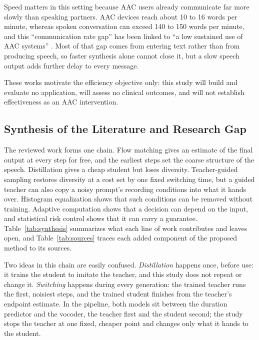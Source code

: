 Speed matters in this setting because AAC users already communicate far more slowly than speaking partners. AAC devices reach about 10 to 16 words per minute, whereas spoken conversation can exceed 140 to 150 words per minute, and this \enquote{communication rate gap} has been linked to \enquote{a low sustained use of AAC systems} \parencite[pp.~1--2]{yusufali2023rate}. Most of that gap comes from entering text rather than from producing speech, so faster synthesis alone cannot close it, but a slow speech output adds further delay to every message.

These works motivate the efficiency objective only: this study will build and evaluate no application, will assess no clinical outcomes, and will not establish effectiveness as an AAC intervention.

\subsection{Synthesis of the Literature and Research Gap}
\label{sec:rrl-synthesis}
\label{sec:rrl-gap}

The reviewed work forms one chain. Flow matching gives an estimate of the final output at every step for free, and the earliest steps set the coarse structure of the speech. Distillation gives a cheap student but loses diversity. Teacher-guided sampling restores diversity at a cost set by one fixed switching time, but a guided teacher can also copy a noisy prompt's recording conditions into what it hands over. Histogram equalization shows that such conditions can be removed without training. Adaptive computation shows that a decision can depend on the input, and statistical risk control shows that it can carry a guarantee. Table~\ref{tab:synthesis} summarizes what each line of work contributes and leaves open, and Table~\ref{tab:sources} traces each added component of the proposed method to its sources.

Two ideas in this chain are easily confused. \emph{Distillation} happens once, before use: it trains the student to imitate the teacher, and this study does not repeat or change it. \emph{Switching} happens during every generation: the trained teacher runs the first, noisiest steps, and the trained student finishes from the teacher's endpoint estimate. In the pipeline, both models sit between the duration predictor and the vocoder, the teacher first and the student second; the study stops the teacher at one fixed, cheaper point and changes only what it hands to the student.

